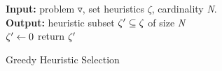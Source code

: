 \documentclass[11pt,a4paper,oneside]{report}
\begin{document}
\begin{algorithm}[H]
\textbf{Input:} problem $\triangledown$, set heuristics $\zeta
$, cardinality \textit{N}.\\
\textbf{Output:} heuristic subset $\zeta\sp{\prime} \subseteq \zeta$ of size \textit{N}\\
\SetAlgoLined
 $\zeta\sp{\prime} \leftarrow 0$\;
 return $\zeta\sp{\prime}$
 \caption{Greedy Heuristic Selection}
\end{algorithm}


%
\end{document}
